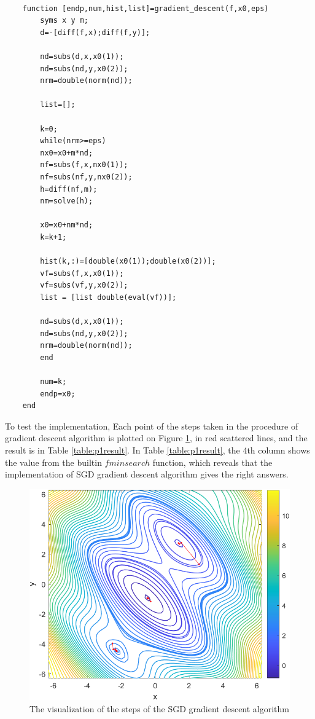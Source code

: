 \documentclass[12pt]{article}
\begin{document}
\begin{lstlisting}[style=MatlabStyle,caption=SGD Gradient Descent,label=code:sgd]

	function [endp,num,hist,list]=gradient_descent(f,x0,eps)
		syms x y m;
		d=-[diff(f,x);diff(f,y)];
		
		nd=subs(d,x,x0(1));
		nd=subs(nd,y,x0(2));
		nrm=double(norm(nd));
		
		list=[];
		
		k=0;
		while(nrm>=eps)
		nx0=x0+m*nd;
		nf=subs(f,x,nx0(1));
		nf=subs(nf,y,nx0(2));
		h=diff(nf,m);
		nm=solve(h);
		
		x0=x0+nm*nd;
		k=k+1;
		
		hist(k,:)=[double(x0(1));double(x0(2))];
		vf=subs(f,x,x0(1));
		vf=subs(vf,y,x0(2));
		list = [list double(eval(vf))];
		
		nd=subs(d,x,x0(1));
		nd=subs(nd,y,x0(2)); 
		nrm=double(norm(nd));
		end
		
		num=k;
		endp=x0;
	end
\end{lstlisting}

To test the implementation, Each point of the steps taken in the procedure of gradient descent algorithm is plotted on Figure \ref{fig:p1_visualize_in_contour}, in red scattered lines, and the result is in Table \ref{table:p1result}. In Table \ref{table:p1result}, the 4th column shows the value from the builtin $fminsearch$ function, which reveals that the implementation of SGD gradient descent algorithm gives the right answers.

\begin{figure}[h]
	\caption{The visualization of the steps of the SGD gradient descent algorithm}
	\centering
	\includegraphics{p1_visualize_in_contour.png}
	
	\label{fig:p1_visualize_in_contour}
\end{figure}
\end{document}
